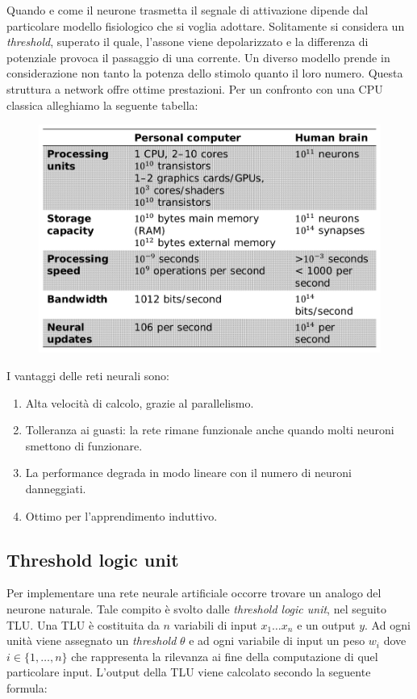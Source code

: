 \documentclass[10pt,a4paper]{article}
\begin{document}
Quando e come il neurone trasmetta il segnale di attivazione dipende dal particolare modello fisiologico che si voglia adottare. Solitamente si considera un \emph{threshold}, superato il quale, l'assone viene depolarizzato e la differenza di potenziale provoca il passaggio di una corrente. Un diverso modello prende in considerazione non tanto la potenza dello stimolo quanto il loro numero. 
Questa struttura a network offre ottime prestazioni. Per un confronto con una CPU classica alleghiamo la seguente tabella:

\begin{figure}
\centering
\includegraphics[scale=0.3]{img/cpuvshuman.png}
\end{figure}

\newpage

I vantaggi delle reti neurali sono:

\begin{enumerate}
\item{Alta velocità di calcolo, grazie al parallelismo.}
\item{Tolleranza ai guasti: la rete rimane funzionale anche quando molti neuroni smettono di funzionare.}
\item{La performance degrada in modo lineare con il numero di neuroni danneggiati.}
\item{Ottimo per l'apprendimento induttivo.}
\end{enumerate}

\subsection{Threshold logic unit}

Per implementare una rete neurale artificiale occorre trovare un analogo del neurone naturale. Tale compito è svolto dalle \emph{threshold logic unit}, nel seguito TLU. Una TLU è costituita da $n$ variabili di input $x_1 \dots x_n$ e un output $y$. Ad ogni unità viene assegnato un \emph{threshold} $\theta$ e ad ogni variabile di input un peso $w_i$ dove $i \in \{1, \dots ,n\}$ che rappresenta la rilevanza ai fine della computazione di quel particolare input.
L'output della TLU viene calcolato secondo la seguente formula:
\end{document}
